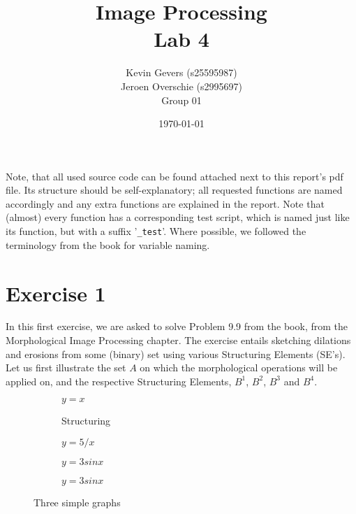 \documentclass{article}
\title{Image Processing\\
    Lab 4}
\author{Kevin Gevers (s25595987) \\ Jeroen Overschie (s2995697)\\Group 01}
\date{\today}
\begin{document}
\maketitle

Note, that all used source code can be found attached next to this report's pdf file. Its structure should be self-explanatory; all requested functions are named accordingly and any extra functions are explained in the report. Note that (almost) every function has a corresponding test script, which is named just like its function, but with a suffix '\texttt{\_test}'. Where possible, we followed the terminology from the book \citep{gonzalez2008digital} for variable naming.

\section*{Exercise 1}
In this first exercise, we are asked to solve Problem 9.9 from the book, from the Morphological Image Processing chapter. The exercise entails sketching dilations and erosions from some (binary) set using various Structuring Elements (SE's). Let us first illustrate the set $A$ on which the morphological operations will be applied on, and the respective Structuring Elements, $B^1$, $B^2$, $B^3$ and $B^4$.

\begin{figure}
     \centering
     \begin{subfigure}[b]{0.19\textwidth}
         \centering
         
         \caption{$y=x$}
         \label{fig:y equals x}
     \end{subfigure}
     \hfill
     \begin{subfigure}[b]{0.19\textwidth}
         \centering
         
         \caption{Structuring}
         \label{fig:SE_B1}
     \end{subfigure}
     \hfill
     \begin{subfigure}[b]{0.19\textwidth}
         \centering
         
         \caption{$y=5/x$}
         \label{fig:SE_B2}
     \end{subfigure}
     \hfill
     \begin{subfigure}[b]{0.19\textwidth}
         \centering
         
         \caption{$y=3sinx$}
         \label{fig:SE_B3}
     \end{subfigure}
     \hfill
     \begin{subfigure}[b]{0.19\textwidth}
         \centering
         
         \caption{$y=3sinx$}
         \label{fig:SE_B4}
     \end{subfigure}
     
    \caption{Three simple graphs}
    \label{fig:three graphs}
\end{figure}
\end{document}
